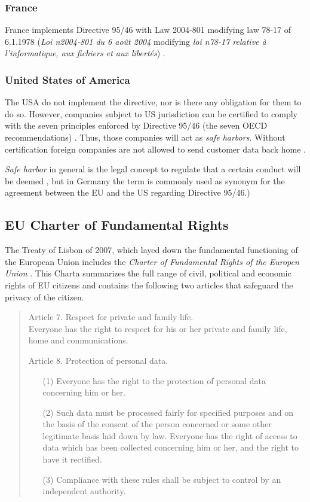 \subsubsection*{France}

France implements Directive 95/46 with Law 2004-801 modifying law 78-17 of 6.1.1978 (\emph{Loi n2004-801 du 6 ao\^{u}t 2004} modifying \emph{loi n78-17 relative à l'informatique, aux fichiers et aux libert\'{e}s}) \cite{1}\cite{10}\cite{11}.

\subsubsection*{United States of America}

The USA do not implement the directive, nor is there any obligation for them to do so.
However, companies subject to US jurisdiction can be certified to comply with the seven principles enforced by Directive 95/46 (the seven OECD recommendations) \cite{5}.
Thus, those companies will act as \emph{safe harbors}. Without certification foreign companies are not allowed to send customer data back home \cite{9}.

\emph{Safe harbor} in general is the legal concept to regulate that a certain conduct will be deemed \cite{4}, but in Germany the term is commonly used as synonym for the agreement between the EU and the US regarding Directive 95/46.)

\subsection{EU Charter of Fundamental Rights}

The Treaty of Lisbon of 2007, which layed down the fundamental functioning of the European Union
includes the \emph{Charter of Fundamental Rights of the Europen Union} \cite{EUFR2010}.
This Charta summarizes the full range of civil, political and economic rights of EU citizens and contains the following two articles that safeguard the privacy of the citizen.
\begin{quote}
  Article 7. Respect for private and family life.\\
  Everyone has the right to respect for his or her private and family life, home and communications.

  Article 8. Protection of personal data.
  \begin{enumerate}
    \item [(1)] Everyone has the right to the protection of personal data concerning him or her.
    \item [(2)] Such data must be processed fairly for specified purposes and on the basis of the consent of the person concerned or some other legitimate basis laid down by law.
      Everyone has the right of access to data which has been collected concerning him or her, and the right to have it rectified.
    \item [(3)] Compliance with these rules shall be subject to control by an independent authority.
  \end{enumerate}
\end{quote}

